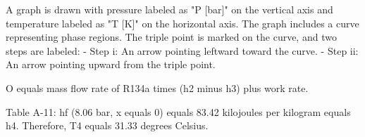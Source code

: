 A graph is drawn with pressure labeled as "P [bar]" on the vertical axis and temperature labeled as "T [K]" on the horizontal axis. The graph includes a curve representing phase regions. The triple point is marked on the curve, and two steps are labeled:  
- Step i: An arrow pointing leftward toward the curve.  
- Step ii: An arrow pointing upward from the triple point.

O equals mass flow rate of R134a times (h2 minus h3) plus work rate.  

Table A-11:  
hf (8.06 bar, x equals 0) equals 83.42 kilojoules per kilogram equals h4.  
Therefore, T4 equals 31.33 degrees Celsius.